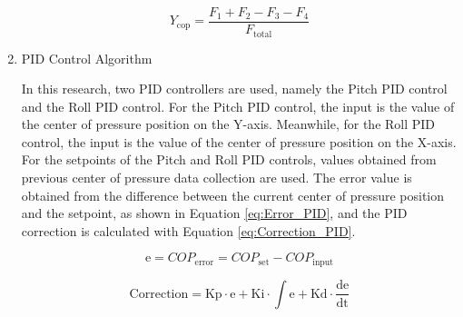 \begin{enumerate}[label=\Alph*.]
    \begin{equation}
      Y_{\mathrm{cop}} = \frac{F_1 + F_2 - F_3 - F_4}{F_{\mathrm{total}}}
      \label{eq:COP_Y}
    \end{equation}

    \item PID Control Algorithm
    \label{subsec:pidcontrolalgorithm}

    \hspace*{1em} In this research, two PID controllers are used, namely the Pitch PID control and the Roll PID control. For the Pitch PID control, the input is the value of the center of pressure position on the Y-axis. Meanwhile, for the Roll PID control, the input is the value of the center of pressure position on the X-axis. For the setpoints of the Pitch and Roll PID controls, values obtained from previous center of pressure data collection are used. The error value is obtained from the difference between the current center of pressure position and the setpoint, as shown in Equation \ref{eq:Error_PID}, and the PID correction is calculated with Equation \ref{eq:Correction_PID}.

\begin{equation}
  \mathrm{e} = COP_{\mathrm{error}} = COP_{\mathrm{set}} - COP_{\mathrm{input}}
  \label{eq:Error_PID}
\end{equation}

\begin{equation}
  \mathrm{Correction} = \mathrm{Kp} \cdot \mathrm{e} + \mathrm{Ki} \cdot \int \mathrm{e} + \mathrm{Kd} \cdot \frac{\mathrm{de}}{\mathrm{dt}}
  \label{eq:Correction_PID}
\end{equation}

 
\end{enumerate}
